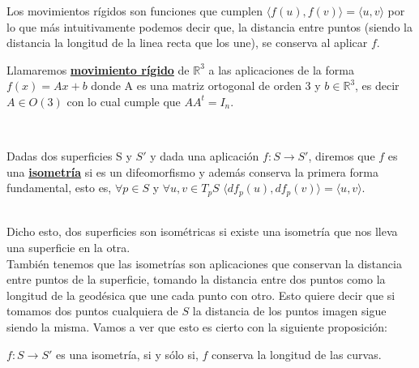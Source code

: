 Los movimientos rígidos son funciones que cumplen $\langle f(u), f(v) \rangle = \langle u, v \rangle$ por lo que más intuitivamente podemos decir que, la distancia entre puntos (siendo la distancia la longitud de la linea recta que los une), se conserva al aplicar $f$.
${ }$\\

\begin{definicion}
	Llamaremos \underline{\textbf{movimiento rígido}} de $\mathbb{R}^3$ a las aplicaciones de la forma $f(x) = Ax + b$ donde A es una matriz ortogonal de orden 3 y $b \in \mathbb{R}^3$, es decir $A \in O(3)$ con lo cual cumple que $AA^{t} = I_{n}$.
\end{definicion}
${ }$\\


\begin{definicion}\label{def:isom} %
	Dadas dos superficies S y $S'$ y dada una aplicación $f : S \longrightarrow S'$, diremos que $f$ es una \underline{\textbf{isometría}} si es un difeomorfismo y además conserva la primera forma fundamental, esto es, $\forall p \in S$ y $\forall u,v \in T_p S$ $\langle df_p(u), df_p(v)\rangle = \langle u, v\rangle$.
\end{definicion}
${ }$\\

Dicho esto, dos superficies son isométricas si existe una isometría que nos lleva una superficie en la otra.
	${}$\\
	
También tenemos que las isometrías son aplicaciones que conservan la distancia entre puntos de la superficie, tomando la distancia entre dos puntos como la longitud de la geodésica que une cada punto con otro. Esto quiere decir que si tomamos dos puntos cualquiera de $S$ la distancia de los puntos imagen sigue siendo la misma. Vamos a ver que esto es cierto con la siguiente proposición:
${ }$\\

\begin{proposicion}
	$f : S \to S'$ es una isometría, si y sólo si, $f$ conserva la longitud de las curvas.
\end{proposicion}

